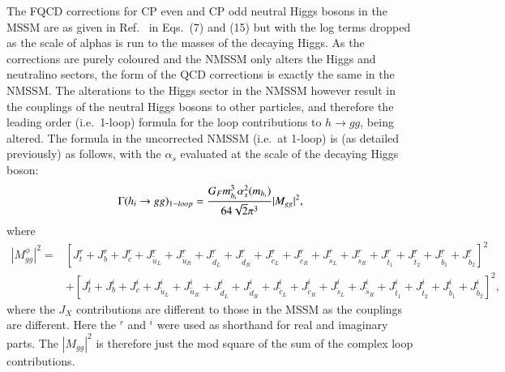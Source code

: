 \documentclass[final,3p,times,pdflatex]{elsarticle}
\begin{document}
The FQCD corrections for CP even and CP odd neutral Higgs bosons in the MSSM
are as given in Ref.~\cite{Djouadi:1996} in Eqs.~(7) and (15) but with the log terms dropped as the scale of alphas is run to the masses of the decaying Higgs.
As the corrections are purely coloured and the NMSSM only alters the Higgs and neutralino sectors, the form of the QCD corrections is exactly the same in the NMSSM\@. The alterations to the Higgs sector in the NMSSM however result in the couplings of the neutral Higgs bosons to other particles, and therefore the leading order (i.e.\ 1-loop) formula for the loop contributions to $h \rightarrow gg$, being altered. The formula in the uncorrected NMSSM (i.e.\ at 1-loop) is (as detailed previously) as follows, with the $\alpha_s$ evaluated at the scale of the decaying Higgs boson:
\begin{equation} \label{hggNMSSMnorm}
\Gamma(h_{i} \rightarrow gg)_{1-loop} = {G_{F} m_{h_i}^3 \alpha_{s}^2 (m_{h_i}) \over 64 \sqrt{2} \pi^3} |M_{gg}|^2,
\end{equation}
where
\begin{equation}
\begin{aligned}
|M_{gg}^\phi|^2 = & [J_{t}^{r} + J_{b}^{r} + J_{c}^{r} + J_{\tilde{u}_L}^{r} + J_{\tilde{u}_R}^{r} + J_{\tilde{d}_L}^{r} + J_{\tilde{d}_R}^{r} + J_{\tilde{c}_L}^{r} + J_{\tilde{c}_R}^{r} + J_{\tilde{s}_L}^{r} + J_{\tilde{s}_R}^{r} + J_{\tilde{t}_1}^{r} + J_{\tilde{t}_2}^{r} + J_{\tilde{b}_1}^{r} + J_{\tilde{b}_2}^{r}]^2 \\ & + [J_{t}^{i} + J_{b}^{i} + J_{c}^{i} + J_{\tilde{u}_L}^{i} + J_{\tilde{u}_R}^{i} + J_{\tilde{d}_L}^{i} + J_{\tilde{d}_R}^{i} + J_{\tilde{c}_L}^{i} + J_{\tilde{c}_R}^{i} + J_{\tilde{s}_L}^{i} + J_{\tilde{s}_R}^{i} + J_{\tilde{t}_1}^{i} + J_{\tilde{t}_2}^{i} + J_{\tilde{b}_1}^{i} + J_{\tilde{b}_2}^{i}]^2,
\end{aligned}
\end{equation}
where the $J_{X}$ contributions are different to those in the MSSM as the
couplings are different. Here the $^{r}$ and $^{i}$ were used as shorthand for
real and imaginary parts. The $|M_{gg}|^2$ is therefore just the mod square of
the sum of the complex loop contributions. 
\end{document}
